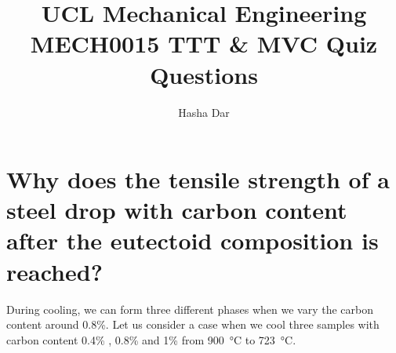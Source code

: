 \documentclass[11pt]{article}
\begin{document}
\title{\textbf{UCL Mechanical Engineering}\\MECH0015 TTT \& MVC Quiz Questions}
\author{Hasha Dar}
\maketitle
\section{Why does the tensile strength of a steel drop with carbon content after the eutectoid composition is reached?}
During cooling, we can form three different phases when we vary the carbon content around 0.8\%. Let us consider a case when we cool three samples with carbon content 0.4\% , 0.8\%  and 1\%  from \SI{900}{\celsius} to \SI{723}{\celsius}. 
\end{document}
